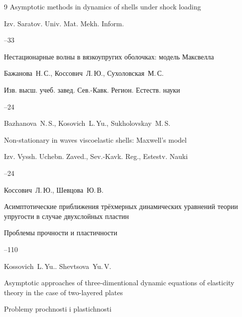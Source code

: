 \begin{thebibliography}{9}
\paper Asymptotic methods in dynamics of shells under shock loading

\jour Izv. Saratov. Univ. Mat. Mekh. Inform.




--33






\paper Нестационарные волны в вязкоупругих оболочках: модель Максвелла

\by    Бажанова~Н.\,С., Коссович~Л.\,Ю., Сухоловская~М.\,С.

\jour Изв. высш. учеб. завед. Сев.-Кавк. Регион. Естеств. науки



--24

\misctransl

\by Bazhanova~N.\,S., Kosovich~L.\,Yu., Sukholovskay~M.\,S.

\paper Non-stationary in waves viscoelastic shells: Maxwell's model

\jour Izv. Vyssh. Uchebn. Zaved., Sev.-Kavk. Reg., Estestv. Nauki



--24








\by Коссович~Л.\,Ю., Шевцова~Ю.\,В.

\paper Асимптотические приближения трёхмерных динамических уравнений теории упругости в случае двухслойных пластин

\jour  Проблемы прочности и пластичности



--110

\misctransl

\by Kossovich~L.\,Yu.. Shevtsova~Yu.\,V.

\paper Asymptotic approaches of three-dimentional dynamic equations of elasticity theory in the case of two-layered plates

\jour Problemy prochnosti i plastichnosti


\end{thebibliography}
